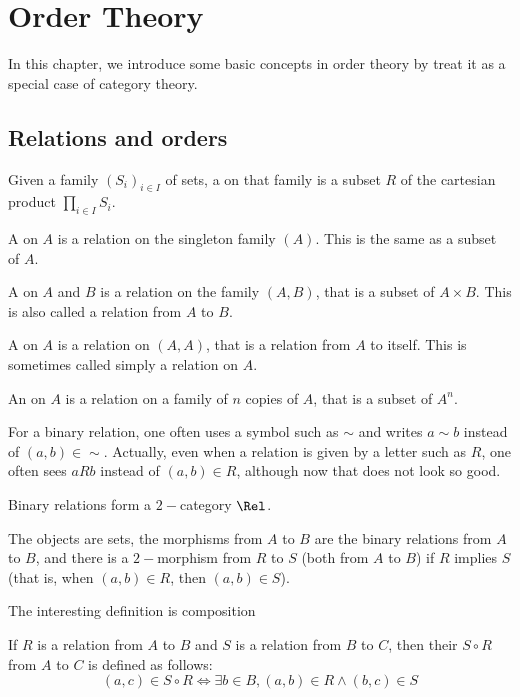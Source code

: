 \chapter{Order Theory}
  In this chapter, we introduce some basic concepts in order theory by treat it as a special case of category theory.
\minitoc
\newpage
\section{Relations and orders}
  \begin{defn}
    Given a family $(S_i)_{i\in I}$ of sets, a  on that family is a subset $R$ of the cartesian product $\prod_{i\in I}S_i$.

    A  on $A$ is a relation on the singleton family $(A)$. This is the same as a subset of $A$.

    A  on $A$ and $B$ is a relation on the family $(A,B)$, that is a subset of $A\times B$. This is also called a relation from $A$ to $B$.

    A  on $A$ is a relation on $(A,A)$, that is a relation from $A$ to itself. This is sometimes called simply a relation on $A$.

    An  on $A$ is a relation on a family of $n$ copies of $A$, that is a subset of $A^n$.

    For a binary relation, one often uses a symbol such as $\sim$ and writes $a\sim b$ instead of $(a,b)\in\sim$. Actually, even when a relation is given by a letter such as $R$, one often sees $aRb$ instead of $(a,b)\in R$, although now that does not look so good.
  \end{defn}

    Binary relations form a $2-$category $\Rel$.

    The objects are sets, the morphisms from $A$ to $B$ are the binary relations from $A$ to $B$, and there is a $2-$morphism from $R$ to $S$ (both from $A$ to $B$) if $R$ implies $S$ (that is, when $(a,b)\in R$, then $(a,b)\in S$).

    The interesting definition is composition
  \begin{defn}
    If $R$ is a relation from $A$ to $B$ and $S$ is a relation from $B$ to $C$, then their  $S\circ R$ from $A$ to $C$ is defined as follows:
    \begin{equation*}
      (a,c)\in S\circ R \iff \exists b\in B, (a,b)\in R \wedge (b,c)\in S
    \end{equation*}
  \end{defn}

